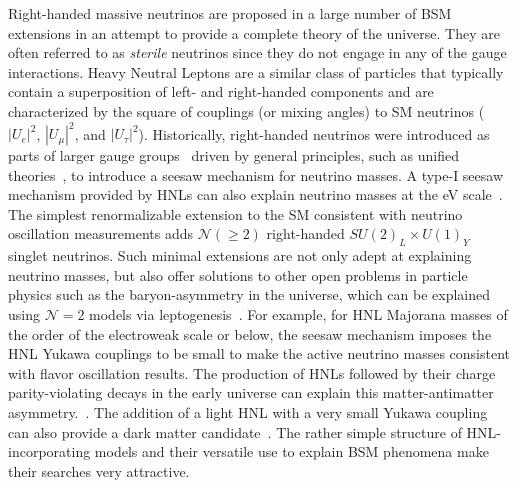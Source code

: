 Right-handed massive neutrinos are proposed in a large number of BSM extensions in an attempt to provide a complete theory of the universe. They are often referred to as \textit{sterile} neutrinos since they do not engage in any of the gauge interactions. Heavy Neutral Leptons are a similar class of particles that typically contain a superposition of left- and right-handed components and are characterized by the square of couplings (or mixing angles) to SM neutrinos ($|U_e|^2$, $|U_\mu|^2$, and $|U_\tau|^2$). Historically, right-handed neutrinos were introduced as parts of larger gauge groups~\cite{PhysRevD.11.2558} driven by general principles, such as unified theories~\cite{PhysRevD.10.275}, to introduce a seesaw mechanism for neutrino masses. A type-I seesaw mechanism provided by HNLs can also explain neutrino masses at the eV scale~\cite{PhysRevD.22.2227}. The simplest renormalizable extension to the SM consistent with neutrino oscillation measurements adds $\mathcal{N}(\geq 2)$ right-handed $SU(2)_L\times U(1)_Y$ singlet neutrinos. Such minimal extensions are not only adept at explaining neutrino masses, but also offer solutions to other open problems in particle physics such as the baryon-asymmetry in the universe, which can be explained using $\mathcal{N}=2$ models via leptogenesis~\cite{Kuzmin1985}. For example, for HNL Majorana masses of the order of the electroweak scale or below, the seesaw mechanism imposes the HNL Yukawa couplings to be small to make the active neutrino masses consistent with flavor oscillation results. The production of HNLs followed by their charge parity-violating decays in the early universe can explain this matter-antimatter asymmetry.~\cite{Asaka2005, Fukugita1986}. The addition of a light HNL with a very small Yukawa coupling can also provide a dark matter candidate~\cite{PhysRevLett.72.17, Asaka2005}. The rather simple structure of HNL-incorporating models and their versatile use to explain BSM phenomena make their searches very attractive.

